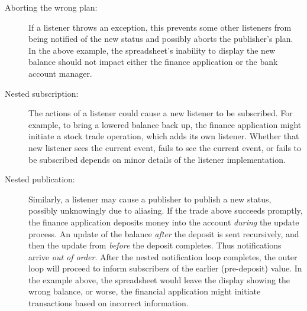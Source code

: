 \documentclass{llncs}
\begin{document}
\begin{description}

\item[Aborting the wrong plan:] 

If a listener throws an exception, this prevents some other listeners
from being notified of the new status and possibly aborts the
publisher's plan. In the above example, the spreadsheet's inability to
display the new balance should not impact either the finance
application or the bank account manager.

\item[Nested subscription:] 

The actions of a listener could cause a new listener to be subscribed.
For example, to bring a lowered balance back up, the finance
application might initiate a stock trade operation, which adds its own
listener.  Whether that new listener sees the current event, fails to
see the current event, or fails to be subscribed depends on minor
details of the listener implementation.

\item[Nested publication:] 

Similarly, a listener may cause a publisher to publish a new status,
possibly unknowingly due to aliasing.  If the trade above succeeds
promptly, the finance application deposits money into the account
\emph{during} the update process.  An update of the balance
\emph{after} the deposit is sent recursively, and then the update from
\emph{before} the deposit completes. Thus notifications arrive
\emph{out of order}. After the nested notification loop completes, the
outer loop will proceed to inform subscribers of the earlier
(pre-deposit) value. In the example above, the spreadsheet would leave
the display showing the wrong balance, or worse, the financial
application might initiate transactions based on incorrect
information.


\end{description}
\end{document}

